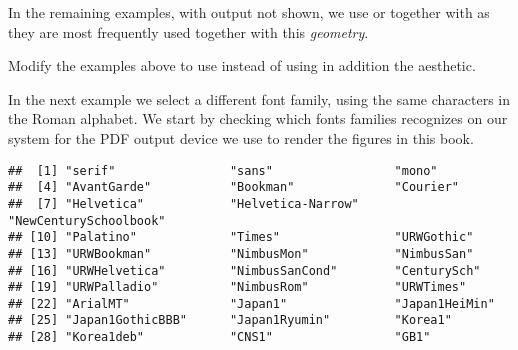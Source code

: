 \documentclass[krantz2]{krantz}\usepackage{knitr}%
\begin{document}
In the remaining examples, with output not shown, we use  or  together with  as they are most frequently used together with this \emph{geometry}.

\begin{knitrout}\footnotesize
{}\color{fgcolor}\begin{kframe}
\begin{alltt}
 \hlkwb{<-}
  \hlstd{(} \hlstd{=} \hlopt{:}\hlstd{,}
              \hlstd{=} \hlstd{(}\hlstd{,} \hlstd{),}
              \hlstd{=} \hlstd{(}\hlstd{,} \hlstd{,} \hlstd{,} \hlstd{,} \hlstd{))}

    \hlopt{+}
  \hlstd{(} \hlstd{=} \hlstd{,}  \hlstd{=} \hlstd{,}  \hlstd{=} \hlstd{)} \hlopt{+}
  \hlstd{()}
\end{alltt}
\end{kframe}
\end{knitrout}

\begin{playground}
Modify the examples above to use  instead of  using in addition the  aesthetic.
\end{playground}

In the next example we select a different font family, using the same characters in the Roman alphabet.
We start by checking which fonts families \Rlang recognizes on our system for the PDF output device we use to render the figures in this book.

\begin{knitrout}\footnotesize
{}\color{fgcolor}\begin{kframe}
\begin{alltt}
\hlstd{(}\hlstd{())}
\end{alltt}
\begin{verbatim}
##  [1] "serif"                "sans"                 "mono"                
##  [4] "AvantGarde"           "Bookman"              "Courier"             
##  [7] "Helvetica"            "Helvetica-Narrow"     "NewCenturySchoolbook"
## [10] "Palatino"             "Times"                "URWGothic"           
## [13] "URWBookman"           "NimbusMon"            "NimbusSan"           
## [16] "URWHelvetica"         "NimbusSanCond"        "CenturySch"          
## [19] "URWPalladio"          "NimbusRom"            "URWTimes"            
## [22] "ArialMT"              "Japan1"               "Japan1HeiMin"        
## [25] "Japan1GothicBBB"      "Japan1Ryumin"         "Korea1"              
## [28] "Korea1deb"            "CNS1"                 "GB1"
\end{verbatim}
\end{kframe}
\end{knitrout}
\end{document}
